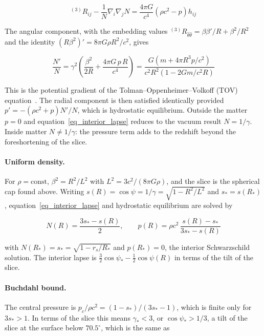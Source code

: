 \documentclass[anonymous]{iopjournal}
\begin{document}
\begin{equation}
    {}^{(3)}\!R_{ij}-\frac{1}{N}\nabla_i\nabla_jN=\frac{4\pi G}{c^{4}}\left(\rho c^{2}-p\right)h_{ij}
\end{equation}

The angular component, with the embedding values ${}^{(3)}\!R_{\hat\theta\hat\theta}=\beta\beta'/R+\beta^2/R^2$ and the identity $\left(R\beta^2\right)'=8\pi G\rho R^2/c^2$, gives

\begin{equation}\label{eq_interior_lapse}
    \frac{N'}{N}=\gamma^{2}\left(\frac{\beta^{2}}{2R}+\frac{4\pi G\,p\,R}{c^{4}}\right)
    =\frac{G\left(m+4\pi R^{3}p/c^{2}\right)}{c^{2}R^{2}\left(1-2Gm/c^{2}R\right)}
\end{equation}

This is the potential gradient of the Tolman--Oppenheimer--Volkoff (TOV) equation~\cite{Tolman1939,OppenheimerVolkoff1939}. The radial component is then satisfied identically provided $p'=-\left(\rho c^2+p\right)N'/N$, which is hydrostatic equilibrium. Outside the matter $p=0$ and equation~\eqref{eq_interior_lapse} reduces to the vacuum result $N=1/\gamma$. Inside matter $N\neq1/\gamma$: the pressure term adds to the redshift beyond the foreshortening of the slice.

\paragraph{Uniform density.} For $\rho=\text{const}$, $\beta^2=R^2/L^2$ with $L^2=3c^2/(8\pi G\rho)$, and the slice is the spherical cap found above. Writing $s(R)=\cos\psi=1/\gamma=\sqrt{1-R^2/L^2}$ and $s_*=s(R_*)$, equation~\eqref{eq_interior_lapse} and hydrostatic equilibrium are solved by

\begin{equation}\label{eq_uniform_interior}
    N(R)=\frac{3s_*-s(R)}{2},
    \qquad
    p(R)=\rho c^{2}\,\frac{s(R)-s_*}{3s_*-s(R)}
\end{equation}

with $N(R_*)=s_*=\sqrt{1-r_s/R_*}$ and $p(R_*)=0$, the interior Schwarzschild solution. The interior lapse is $\tfrac32\cos\psi_*-\tfrac12\cos\psi(R)$ in terms of the tilt of the slice.

\paragraph{Buchdahl bound.} The central pressure is $p_c/\rho c^2=(1-s_*)/(3s_*-1)$, which is finite only for $3s_*>1$. In terms of the slice this means $\gamma_*<3$, or $\cos\psi_*>1/3$, a tilt of the slice at the surface below $70.5^\circ$, which is the same as
\end{document}
